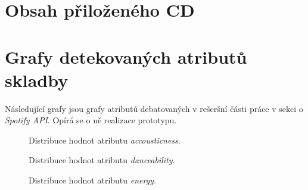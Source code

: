 \documentclass[thesis=B, czech]{FITthesis}[2019/03/06]
\begin{document}
\printglossaries


\chapter{Obsah přiloženého CD}

\begin{figure}
\end{figure}

\chapter{Grafy detekovaných atributů skladby} \label{ch:C}

Následující grafy jsou grafy atributů debatovaných v rešeršní části práce v sekci o \textit{Spotify API}. Opírá se o ně realizace prototypu.


\begin{figure}[b]
\def\svgwidth{1.0\textwidth}
    \centering
    
        \caption[]{
        Distribuce hodnot atributu \textit{accousticness}.}
    \label{fig:accousticness}
\end{figure}

\begin{figure}[b]
\def\svgwidth{1.0\textwidth}
    \centering
    
        \caption[]{
        Distribuce hodnot atributu \textit{danceability}.}
    \label{fig:danceability2}
\end{figure}

\begin{figure}[b]
\def\svgwidth{1.0\textwidth}
    \centering
    
        \caption[]{
        Distribuce hodnot atributu \textit{energy}.}
    \label{fig:energy}
\end{figure}
\end{document}
